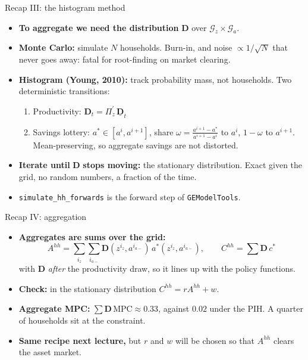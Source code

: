 \documentclass[
  10pt,
  ignorenonframetext,
  aspectratio=43,
  english,
  handout]{beamer}
\providecommand{\tightlist}{%
  \setlength{\itemsep}{0pt}\setlength{\parskip}{0pt}}
\begin{document}
\begin{frame}[fragile]{Recap III: the histogram method}
\protect{}\label{recap-iii-the-histogram-method}
\begin{itemize}
\tightlist
\item
  \textbf{To aggregate we need the distribution} \(\boldsymbol{D}\) over \(\mathcal{G}_{z}\times\mathcal{G}_{a}\).
\item
  \textbf{Monte Carlo:} simulate \(N\) households. Burn-in, and noise \(\propto1/\sqrt{N}\) that never goes away: fatal for root-finding on market clearing.
\item
  \textbf{Histogram (Young, 2010):} track probability mass, not households. Two deterministic transitions:

  \begin{enumerate}
  \tightlist
  \item
    Productivity: \(\boldsymbol{D}_{t}=\Pi_{z}^{\prime}\,\underline{\boldsymbol{D}}_{t}\)
  \item
    Savings lottery: \(a^{\ast}\in[a^{i},a^{i+1}]\), share \(\omega=\frac{a^{i+1}-a^{\ast}}{a^{i+1}-a^{i}}\) to \(a^{i}\), \(1-\omega\) to \(a^{i+1}\). Mean-preserving, so aggregate savings are not distorted.
  \end{enumerate}
\item
  \textbf{Iterate until} \(\boldsymbol{D}\) \textbf{stops moving:} the stationary distribution. Exact given the grid, no random numbers, a fraction of the time.
\item
  \texttt{simulate\_hh\_forwards} is the forward step of \texttt{GEModelTools}.
\end{itemize}
\end{frame}

\begin{frame}{Recap IV: aggregation}
\protect{}\label{recap-iv-aggregation}
\begin{itemize}
\tightlist
\item
  \textbf{Aggregates are sums over the grid:}
  \[
  A^{hh}=\sum_{i_{z}}\sum_{i_{a-}}\boldsymbol{D}(z^{i_{z}},a^{i_{a-}})\,a^{\ast}(z^{i_{z}},a^{i_{a-}}),\qquad C^{hh}=\sum\boldsymbol{D}\,c^{\ast}
  \]
  with \(\boldsymbol{D}\) \emph{after} the productivity draw, so it lines up with the policy functions.
\item
  \textbf{Check:} in the stationary distribution \(C^{hh}=rA^{hh}+w\).
\item
  \textbf{Aggregate MPC:} \(\sum\boldsymbol{D}\,\text{MPC}\approx0.33\), against \(0.02\) under the PIH. A quarter of households sit at the constraint.
\item
  \textbf{Same recipe next lecture,} but \(r\) and \(w\) will be chosen so that \(A^{hh}\) clears the asset market.
\end{itemize}
\end{frame}
\end{document}
